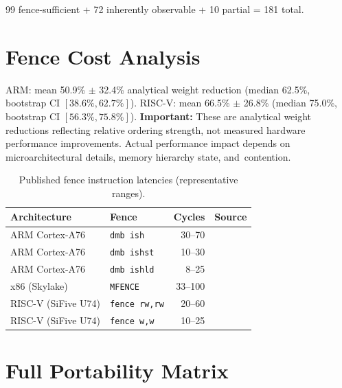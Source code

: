 \documentclass[11pt]{article}
\begin{document}
99 fence-sufficient + 72 inherently observable + 10 partial = 181 total.

\section{Fence Cost Analysis}
\label{app:fence-cost-analysis}

ARM\@: mean 50.9\% $\pm$ 32.4\% analytical weight reduction
(median 62.5\%, bootstrap CI $[38.6\%,\allowbreak 62.7\%]$).
RISC-V\@: mean 66.5\% $\pm$ 26.8\%
(median 75.0\%, bootstrap CI $[56.3\%,\allowbreak 75.8\%]$).
\textbf{Important:} These are analytical weight reductions
reflecting relative ordering strength, not measured hardware
performance improvements.  Actual performance impact depends
on micro\-architectural details, memory hierarchy state,
and~contention.

\begin{table}[ht]
\centering
\caption{Published fence instruction latencies (representative ranges).}
\small
\begin{tabular}{llrl}
\toprule
\textbf{Architecture} & \textbf{Fence} & \textbf{Cycles} & \textbf{Source} \\
\midrule
ARM Cortex-A76     & \texttt{dmb ish}    & 30--70  & \cite{arm-opt-guide} \\
ARM Cortex-A76     & \texttt{dmb ishst}  & 10--30  & \cite{arm-opt-guide} \\
ARM Cortex-A76     & \texttt{dmb ishld}  & 8--25   & \cite{arm-opt-guide} \\
x86 (Skylake)      & \texttt{MFENCE}     & 33--100 & \cite{agner-fog} \\
RISC-V (SiFive U74)& \texttt{fence rw,rw}& 20--60  & \cite{sifive-u74} \\
RISC-V (SiFive U74)& \texttt{fence w,w}  & 10--25  & \cite{sifive-u74} \\
\bottomrule
\end{tabular}
\end{table}

\section{Full Portability Matrix}
\label{app:full-matrix}
\end{document}
